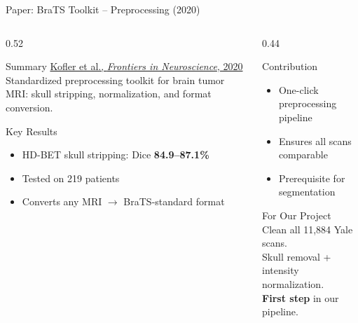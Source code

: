 \documentclass[aspectratio=169,xcolor=dvipsnames]{beamer}
\begin{document}
\begin{frame}{Paper: BraTS Toolkit -- Preprocessing (2020)}
    \begin{columns}
        \begin{column}{0.52\textwidth}
            \begin{block}{Summary}
                \small
                \href{https://doi.org/10.3389/fnins.2020.00125}{Kofler et al., \textit{Frontiers in Neuroscience}, 2020}\\[0.3em]
                Standardized preprocessing toolkit for brain tumor MRI: skull stripping, normalization, and format conversion.
            \end{block}

            \vspace{0.2em}

            \begin{block}{Key Results}
                \small
                \begin{itemize}
                    \item HD-BET skull stripping: Dice \textbf{84.9--87.1\%}
                    \item Tested on 219 patients
                    \item Converts any MRI $\to$ BraTS-standard format
                \end{itemize}
            \end{block}
        \end{column}

        \begin{column}{0.44\textwidth}
            \begin{block}{Contribution}
                \small
                \begin{itemize}
                    \item One-click preprocessing pipeline
                    \item Ensures all scans comparable
                    \item Prerequisite for segmentation
                \end{itemize}
            \end{block}

            \vspace{0.2em}

            \begin{alertblock}{For Our Project}
                \small
                Clean all 11,884 Yale scans.\\
                Skull removal + intensity normalization.\\
                \textbf{First step} in our pipeline.
            \end{alertblock}


\end{column}
\end{columns}
\end{frame}
\end{document}

